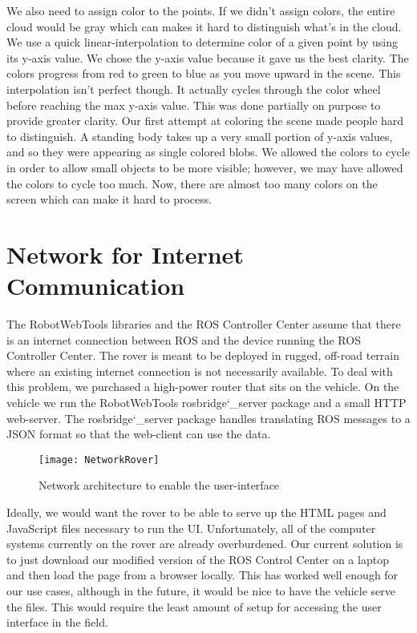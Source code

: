 We also need to assign color to the points.  If we didn't assign colors, the entire cloud would be gray which can makes it hard to distinguish what's in the cloud.  We use a quick linear-interpolation to determine color of a given point by using its y-axis value.  We chose the y-axis value because it gave us the best clarity.  The colors progress from red to green to blue as you move upward in the scene.  This interpolation isn't perfect though.  It actually cycles through the color wheel before reaching the max y-axis value.  This was done partially on purpose to provide greater clarity.  Our first attempt at coloring the scene made people hard to distinguish.  A standing body takes up a very small portion of y-axis values, and so they were appearing as single colored blobs.  We allowed the colors to cycle in order to allow small objects to be more visible; however, we may have allowed the colors to cycle too much.  Now, there are almost too many colors on the screen which can make it hard to process.


\section{Network for Internet Communication}The RobotWebTools libraries and the ROS Controller Center assume that there is an internet connection between ROS and the device running the ROS Controller Center.  The rover is meant to be deployed in rugged, off-road terrain where an existing internet connection is not necessarily available.  To deal with this problem, we purchased a high-power router that sits on the vehicle.  On the vehicle we run the RobotWebTools rosbridge\char`_server package and a small HTTP web-server.  The rosbridge\char`_server package handles translating ROS messages to a JSON format so that the web-client can use the data.

\begin{figure}[H]
\centerline{\texttt{[image: NetworkRover]}}
\caption[]{Network architecture to enable the user-interface}
\label{fig:NetworkRover}
\end{figure}

Ideally, we would want the rover to be able to serve up the HTML pages and JavaScript files necessary to run the UI.  Unfortunately, all of the computer systems currently on the rover are already overburdened.  Our current solution is to just download our modified version of the ROS Control Center on a laptop and then load the page from a browser locally.  This has worked well enough for our use cases, although in the future, it would be nice to have the vehicle serve the files.  This would require the least amount of setup for accessing the user interface in the field.